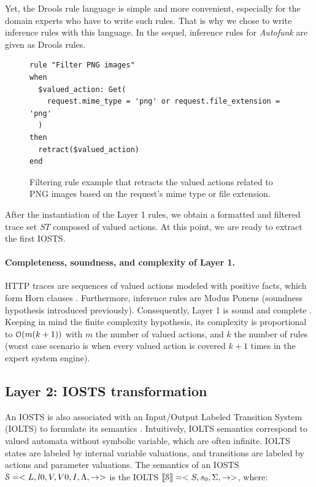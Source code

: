 Yet, the Drools rule language is simple and more convenient,
especially for the domain experts who have to write such rules.
That is why we chose to write inference rules with this language.
In the sequel, inference rules for \emph{Autofunk} are given as
Drools rules.

\begin{figure}[ht]
\begin{framed}
\begin{BVerbatim}
rule "Filter PNG images"
when
  $valued_action: Get(
    request.mime_type = 'png' or request.file_extension = 'png'
  )
then
  retract($valued_action)
end
\end{BVerbatim}
\end{framed}

    \caption{Filtering rule example that retracts the valued actions
    related to PNG images based on the request's mime type or
    file extension.}
    \label{fig:layer1:filter}
\end{figure}

After the instantiation of the Layer 1 rules, we obtain a
formatted and filtered trace set $ST$ composed of valued actions.
At this point, we are ready to extract the first IOSTS.

\paragraph{Completeness, soundness, and complexity of Layer 1.}
HTTP traces are sequences of valued actions modeled with positive
facts, which form Horn clauses \cite{JSL:9106942}.  Furthermore,
inference rules are Modus Ponens (soundness hypothesis introduced
previously).  Consequently, Layer 1 is sound and complete
\cite{logicreasoning}.  Keeping in mind the finite complexity
hypothesis, its complexity is proportional to
$\EuScript{O}(m(k+1))$ with $m$ the number of valued actions, and
$k$ the number of rules (worst case scenario is when every valued
action is covered $k+1$ times in the expert system engine).

\subsection{Layer 2: IOSTS transformation}
\label{sec:modelinf:webapps:L2}

An IOSTS is also associated with an Input/Output Labeled
Transition System (IOLTS) to formulate its semantics
\cite{rusu2005automatic}.  Intuitively, IOLTS semantics
correspond to valued automata without symbolic variable, which
are often infinite. IOLTS states are labeled by internal variable
valuations, and transitions are labeled by actions and parameter
valuations. The semantics of an IOSTS
$\EuScript{S}=<L,l0,V,V0,I,\Lambda,\rightarrow>$ is the IOLTS
$\llbracket \EuScript{S}\rrbracket = <S,s_0,\Sigma,\rightarrow>$,
where:

